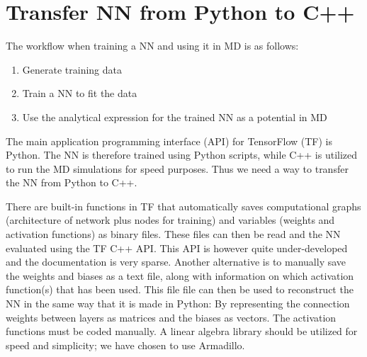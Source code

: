 \documentclass[twoside,english]{uiofysmaster}
\begin{document}
\section{Transfer NN from Python to C++} \label{sec:timeUsage}
The workflow when training a NN and using it in MD is as follows: 
\begin{enumerate}
 \item Generate training data
 \item Train a NN to fit the data
 \item Use the analytical expression for the trained NN as a potential in MD
\end{enumerate}
The main application programming interface (API) for TensorFlow (TF) is Python. The NN is therefore
trained using Python scripts, while C++ is utilized to run the MD simulations for speed purposes. Thus
we need a way to transfer the NN from Python to C++. 

There are built-in functions in TF that automatically saves computational graphs (architecture of network plus
nodes for training) and variables (weights and activation functions) as binary files.
These files can then be read and the NN evaluated using the TF C++ API. This API is however quite under-developed
and the documentation is very sparse. Another alternative is to manually save the weights and biases
as a text file, along with information on which activation function(s) that has been used. This file 
file can then be used to reconstruct the NN in the same way that it is made in Python: By representing
the connection weights between layers as matrices and the biases as vectors. The activation functions
must be coded manually. A linear algebra library should
be utilized for speed and simplicity; we have chosen to use Armadillo. 
\end{document}
